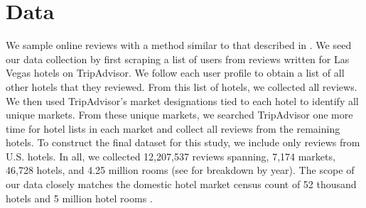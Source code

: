 \documentclass[mksc,blindrev]{informs3} %
\begin{document}








\clearpage

\printbibliography
% 
% 
\clearpage




\section*{Data} \label{sec:data}

We sample online reviews with a method similar to that described in \citet{wang2018and}. We seed our data collection by first scraping a list of users from reviews written for Las Vegas hotels on TripAdvisor. We follow each user profile to obtain a list of all other hotels that they reviewed. From this list of hotels, we collected all reviews. We then used TripAdvisor's market designations tied to each hotel to identify all unique markets. From these unique markets, we searched TripAdvisor one more time for hotel lists in each market and collect all reviews from the remaining hotels. To construct the final dataset for this study, we include only reviews from U.S. hotels. In all, we collected 12,207,537 reviews spanning, 7,174 markets, 46,728 hotels, and 4.25 million rooms (see  for breakdown by year). The scope of our data closely matches the domestic hotel market census count of 52 thousand hotels and 5 million hotel rooms \citep{hotelnews2015}. 
\end{document}
